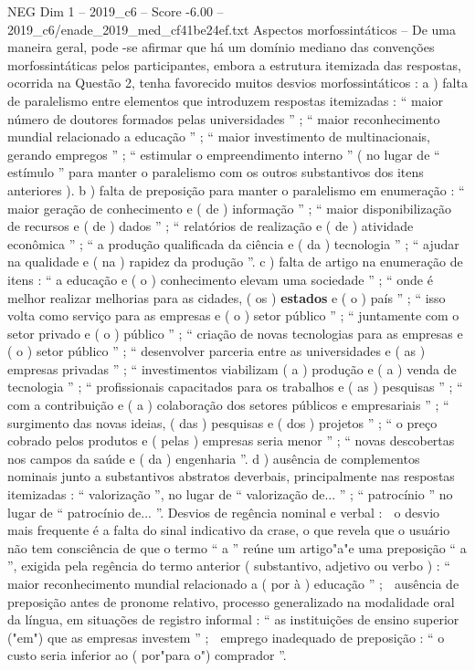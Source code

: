 \begin{textsample}{NEG Dim 1 – 2019\_c6 – Score -6.00 – 2019\_c6/enade\_2019\_med\_cf41be24ef.txt}
Aspectos morfossintáticos – De uma maneira geral, pode -se afirmar que há um domínio mediano das convenções morfossintáticas pelos participantes, embora a estrutura itemizada das respostas, ocorrida na Questão 2, tenha favorecido muitos desvios morfossintáticos : a ) falta de paralelismo entre elementos que introduzem respostas itemizadas : “ maior número de doutores formados pelas universidades ” ; “ maior reconhecimento mundial relacionado a educação ” ; “ maior investimento de multinacionais, gerando empregos ” ; “ estimular o empreendimento interno ” ( no lugar de “ estímulo ” para manter o paralelismo com os outros substantivos dos itens anteriores ). b ) falta de preposição para manter o paralelismo em enumeração : “ maior geração de conhecimento e ( de ) informação ” ; “ maior disponibilização de recursos e ( de ) dados ” ; “ relatórios de realização e ( de ) atividade econômica ” ; “ a produção qualificada da ciência e ( da ) tecnologia ” ; “ ajudar na qualidade e ( na ) rapidez da produção ”. c ) falta de artigo na enumeração de itens : “ a educação e ( o ) conhecimento elevam uma sociedade ” ; “ onde é melhor realizar melhorias para as cidades, ( os ) \textbf{estados} e ( o ) país ” ; “ isso volta como serviço para as empresas e ( o ) setor público ” ; “ juntamente com o setor privado e ( o ) público ” ; “ criação de novas tecnologias para as empresas e ( o ) setor público ” ; “ desenvolver parceria entre as universidades e ( as ) empresas privadas ” ; “ investimentos viabilizam ( a ) produção e ( a ) venda de tecnologia ” ; “ profissionais capacitados para os trabalhos e ( as ) pesquisas ” ; “ com a contribuição e ( a ) colaboração dos setores públicos e empresariais ” ; “ surgimento das novas ideias, ( das ) pesquisas e ( dos ) projetos ” ; “ o preço cobrado pelos produtos e ( pelas ) empresas seria menor ” ; “ novas descobertas nos campos da saúde e ( da ) engenharia ”. d ) ausência de complementos nominais junto a substantivos abstratos deverbais, principalmente nas respostas itemizadas : “ valorização ”, no lugar de “ valorização de... ” ; “ patrocínio ” no lugar de “ patrocínio de... ”.
Desvios de regência nominal e verbal :  o desvio mais frequente é a falta do sinal indicativo da crase, o que revela que o usuário não tem consciência de que o termo “ a ” reúne um artigo"a"e uma preposição “ a ”, exigida pela regência do termo anterior ( substantivo, adjetivo ou verbo ) : “ maior reconhecimento mundial relacionado a ( por à ) educação ” ;  ausência de preposição antes de pronome relativo, processo generalizado na modalidade oral da língua, em situações de registro informal : “ as instituições de ensino superior ("em") que as empresas investem ” ;  emprego inadequado de preposição : “ o custo seria inferior ao ( por"para o") comprador ”.

\end{textsample}

